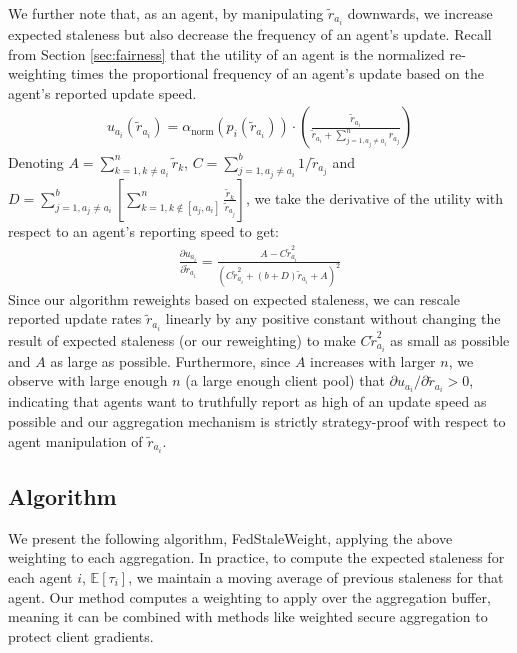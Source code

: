 \documentclass{article}
\begin{document}
We further note that, as an agent, by manipulating $\tilde{r}_{a_i}$ downwards, we increase expected staleness but also decrease the frequency of an agent's update. Recall from Section \ref{sec:fairness} that the utility of an agent is the normalized re-weighting times the proportional frequency of an agent's update based on the agent's reported update speed.
\begin{gather}
    u_{a_i}(\tilde{r}_{a_i}) =  \alpha_{\text{norm}}(p_i(\tilde{r}_{a_i})) 
 \cdot \left( \frac{
        \tilde{r}_{a_i}
    }{
        \tilde{r}_{a_i} + \sum_{j=1, a_j \neq a_i}^n{r_{a_j}}
    }\right) 
\end{gather}
Denoting $A = \sum_{k=1, k \neq a_i}^n{\tilde{r}_k}$, $C = \sum_{j=1, a_j \neq a_i}^b{1/\tilde{r}_{a_j}}$ and $D = \sum_{j=1, a_j \neq a_i}^b{
        \left[\sum_{k=1, k \notin [a_j, a_i]}^n {\frac{\tilde{r}_k}{\tilde{r}_{a_j}}}
        \right]
    }$, we take the derivative of the utility with respect to an agent's reporting speed to get:
\begin{gather*}
    \frac{\partial u_{a_i}}{\partial \tilde{r}_{a_i}}
    = \frac{A - C \tilde{r}_{a_i}^2}{(C\tilde{r}_{a_i}^2 + (b + D) \tilde{r}_{a_i} + A)^2}
\end{gather*}
Since our algorithm reweights based on expected staleness, we can rescale reported update rates $\tilde{r}_{a_i}$ linearly by any positive constant without changing the result of expected staleness (or our reweighting) to make $C \tilde{r}_{a_i}^2$ as small as possible and $A$ as large as possible. Furthermore, since $A$ increases with larger $n$, we observe with large enough $n$ (a large enough client pool) that $\partial u_{a_i}/\partial \tilde{r}_{a_i} > 0$, indicating that agents want to truthfully report as high of an update speed as possible and our aggregation mechanism is strictly strategy-proof with respect to agent manipulation of $\tilde{r}_{a_i}$.

\subsection{Algorithm}

We present the following algorithm, FedStaleWeight, applying the above weighting to each aggregation. In practice, to compute the expected staleness for each agent $i$, $\mathbb{E}[\tau_i]$, we maintain a moving average of previous staleness for that agent. Our method computes a weighting to apply over the aggregation buffer, meaning it can be combined with methods like weighted secure aggregation \cite{guo2021secure} to protect client gradients.
\end{document}
